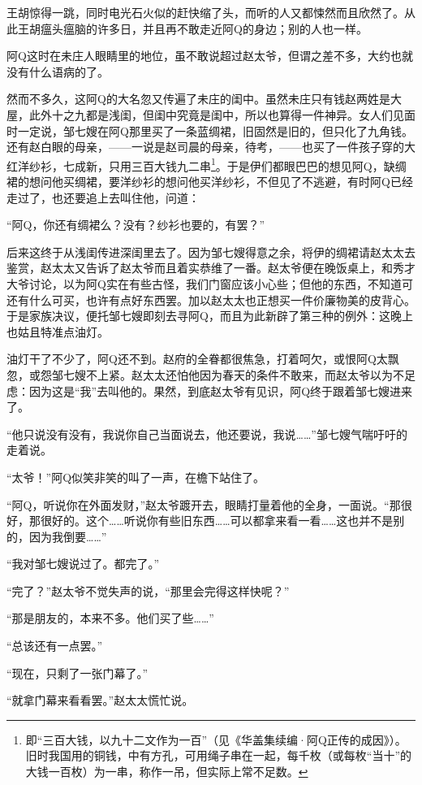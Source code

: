 \documentclass[12pt,UTF8]{ctexbook}
\begin{document}
王胡惊得一跳，同时电光石火似的赶快缩了头，而听的人又都悚然而且欣然了。从此王胡瘟头瘟脑的许多日，并且再不敢走近阿Q的身边；别的人也一样。

阿Q这时在未庄人眼睛里的地位，虽不敢说超过赵太爷，但谓之差不多，大约也就没有什么语病的了。

然而不多久，这阿Q的大名忽又传遍了未庄的闺中。虽然未庄只有钱赵两姓是大屋，此外十之九都是浅闺，但闺中究竟是闺中，所以也算得一件神异。女人们见面时一定说，邹七嫂在阿Q那里买了一条蓝绸裙，旧固然是旧的，但只化了九角钱。还有赵白眼的母亲，——一说是赵司晨的母亲，待考，——也买了一件孩子穿的大红洋纱衫，七成新，只用三百大钱九二串\footnote{即“三百大钱，以九十二文作为一百”（见《华盖集续编·阿Q正传的成因》）。旧时我国用的铜钱，中有方孔，可用绳子串在一起，每千枚（或每枚“当十”的大钱一百枚）为一串，称作一吊，但实际上常不足数。}。于是伊们都眼巴巴的想见阿Q，缺绸裙的想问他买绸裙，要洋纱衫的想问他买洋纱衫，不但见了不逃避，有时阿Q已经走过了，也还要追上去叫住他，问道：

“阿Q，你还有绸裙么？没有？纱衫也要的，有罢？”

后来这终于从浅闺传进深闺里去了。因为邹七嫂得意之余，将伊的绸裙请赵太太去鉴赏，赵太太又告诉了赵太爷而且着实恭维了一番。赵太爷便在晚饭桌上，和秀才大爷讨论，以为阿Q实在有些古怪，我们门窗应该小心些；但他的东西，不知道可还有什么可买，也许有点好东西罢。加以赵太太也正想买一件价廉物美的皮背心。于是家族决议，便托邹七嫂即刻去寻阿Q，而且为此新辟了第三种的例外：这晚上也姑且特准点油灯。

油灯干了不少了，阿Q还不到。赵府的全眷都很焦急，打着呵欠，或恨阿Q太飘忽，或怨邹七嫂不上紧。赵太太还怕他因为春天的条件不敢来，而赵太爷以为不足虑：因为这是“我”去叫他的。果然，到底赵太爷有见识，阿Q终于跟着邹七嫂进来了。

“他只说没有没有，我说你自己当面说去，他还要说，我说……”邹七嫂气喘吁吁的走着说。

“太爷！”阿Q似笑非笑的叫了一声，在檐下站住了。

“阿Q，听说你在外面发财，”赵太爷踱开去，眼睛打量着他的全身，一面说。“那很好，那很好的。这个……听说你有些旧东西……可以都拿来看一看……这也并不是别的，因为我倒要……”

“我对邹七嫂说过了。都完了。”

“完了？”赵太爷不觉失声的说，“那里会完得这样快呢？”

“那是朋友的，本来不多。他们买了些……”

“总该还有一点罢。”

“现在，只剩了一张门幕了。”

“就拿门幕来看看罢。”赵太太慌忙说。
\end{document}
